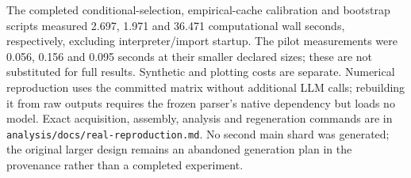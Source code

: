 The completed conditional-selection, empirical-cache calibration and bootstrap scripts measured 2.697, 1.971 and 36.471 computational wall seconds, respectively, excluding interpreter/import startup. The pilot measurements were 0.056, 0.156 and 0.095 seconds at their smaller declared sizes; these are not substituted for full results. Synthetic and plotting costs are separate. Numerical reproduction uses the committed matrix without additional LLM calls; rebuilding it from raw outputs requires the frozen parser's native dependency but loads no model. Exact acquisition, assembly, analysis and regeneration commands are in \texttt{analysis/docs/real-reproduction.md}. No second main shard was generated; the original larger design remains an abandoned generation plan in the provenance rather than a completed experiment.
